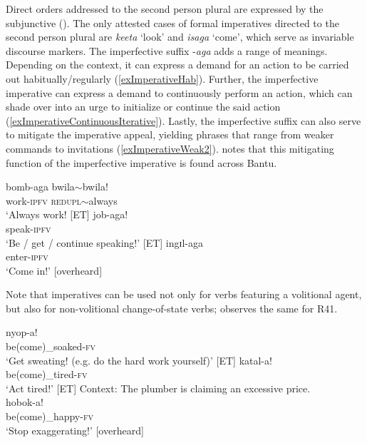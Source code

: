 Direct orders addressed to the second person plural are expressed by the subjunctive (). The only attested cases of formal imperatives directed to the second person plural are \textit{keeta} \lq look' and \textit{isaga} \lq come', which serve as invariable discourse markers. The imperfective suffix -\textit{aga} adds a range of meanings. Depending on the context, it can express a demand for an action to be carried out habitually/regularly (\ref{exImperativeHab}). Further, the imperfective imperative can express a demand to continuously perform an action, which can shade over into an urge to initialize or continue the said action (\ref{exImperativeContinuousIterative}). Lastly, the imperfective suffix can also serve to mitigate the imperative appeal, yielding phrases that range from weaker commands to invitations (\ref{exImperativeWeak2}). \citet[192]{NurseD2008} notes that this mitigating function of the imperfective imperative is found across Bantu.
\begin{exe}
\ex \label{exImperativeHab}
\gll bomb-aga bwila$\sim$bwila!\\
work-\textsc{ipfv} \textsc{redupl}$\sim$always\\
\glt `Always work! [ET]
\ex \label{exImperativeContinuousIterative}
\gll job-aga!\\
speak-\textsc{ipfv}\\
\glt `Be / get / continue speaking!' [ET]
\ex \label{exImperativeWeak2}
\gll ingɪl-aga\\
enter-\textsc{ipfv}\\
\glt `Come in!' [overheard]
\end{exe} 

Note that imperatives can be used not only for verbs featuring a volitional agent, but also for non-volitional change-of-state verbs; \textcite[320]{SeidelF2008} observes the same for  R41.
\begin{exe}
\ex\label{exImperativeNonVolitional1} 
\gll nyop-a!\\
be(come)\_soaked-\textsc{fv}\\
\glt `Get sweating! (e.g. do the hard work yourself)' [ET]
\ex \label{exImperativeNonVolitional2} 
\gll katal-a!\\
be(come)\_tired-\textsc{fv}\\
\glt `Act tired!' [ET]
\ex \label{exImperativeNonVolitional3}
Context: The plumber is claiming an excessive price.\\
\gll hobok-a!\\
be(come)\_happy-\textsc{fv}\\
\glt `Stop exaggerating!' [overheard]
\end{exe}

